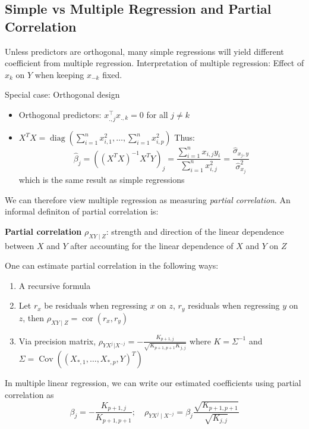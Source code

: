 \documentclass[11pt, %
	oneside, %
	english, %
	onehalfspacing, %
	]{article} %
\numberwithin{equation}{section}
\begin{document}
\subsection{Simple vs Multiple Regression and Partial Correlation}


Unless predictors are orthogonal, many simple regressions will yield different coefficient from multiple regression. Interpretation of multiple regression: Effect of $x_k$ on $Y$ when keeping $x_{-k}$ fixed.


Special case: Orthogonal design
\begin{itemize}
    \item Orthogonal predictors: $x_{., j}^{\top} x_{., k}=0$ for all $j \neq k$
    \item $X^T X=\operatorname{diag}\left(\sum_{i=1}^n x_{i, 1}^2, \ldots, \sum_{i=1}^n x_{i, p}^2\right)$
    Thus:
    $$\hat{\beta}_j=\left(\left(X^T X\right)^{-1} X^T Y\right)_j=\frac{\sum_{i=1}^n x_{i, j} y_i}{\sum_{i=1}^n x_{i, j}^2}=\frac{\widehat{\sigma}_{x_j, y}}{\hat{\sigma}_{x_j}^2}$$
    which is the  same result as simple regressions
\end{itemize}

We can therefore view multiple regression as measuring \emph{partial correlation}. An informal definiton of partial correlation is:

\begin{center}
    \textbf{Partial correlation} $\rho_{X Y \mid Z}$: strength and direction of the linear dependence between $X$ and $Y$ after accounting for the linear dependence of $X$ and $Y$ on $Z$
\end{center}

One can estimate partial correlation in the following ways:
\begin{enumerate}
    \item A recursive formula
    \item Let $r_x$ be residuals when regressing $x$ on $z$, $r_y$ residuals when regressing $y$ on $z$, then $\rho_{X Y \mid Z}=\operatorname{cor}\left(r_x, r_y\right)$
    \item Via precision matrix, $\rho_{Y X^j}{ }_{\mid X^{-j}}=-\frac{K_{p+1, j}}{\sqrt{K_{p+1, p+1} K_{j, j}}}$ where $K=\Sigma^{-1}$ and $\Sigma=\operatorname{Cov}\left(\left(X_{*, 1}, \ldots, X_{*, p}, Y\right)^T\right)$
\end{enumerate}

In multiple linear regression, we can write our estimated coefficients using partial correlation as
\begin{equation}\label{eq.betapartial}
    \beta_j=-\frac{K_{p+1, j}}{K_{p+1, p+1}}; \quad \rho_{Y X^j \mid X^{-j}}=\beta_j \frac{\sqrt{K_{p+1, p+1}}}{\sqrt{K_{j, j}}}
\end{equation}
\end{document}
